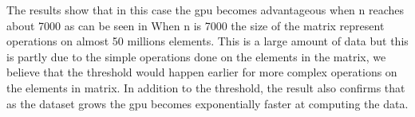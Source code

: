 The results show that in this case the \acrshort{gpu} becomes advantageous when n reaches about 7000 as can be seen in 
When n is 7000 the size of the matrix represent operations on almost 50 millions elements.
This is a large amount of data but this is partly due to the simple operations done on the elements in the matrix, we believe that the threshold would happen earlier for more complex operations on the elements in matrix.
In addition to the threshold, the result also confirms that as the dataset grows the \acrshort{gpu} becomes exponentially faster at computing the data. 
